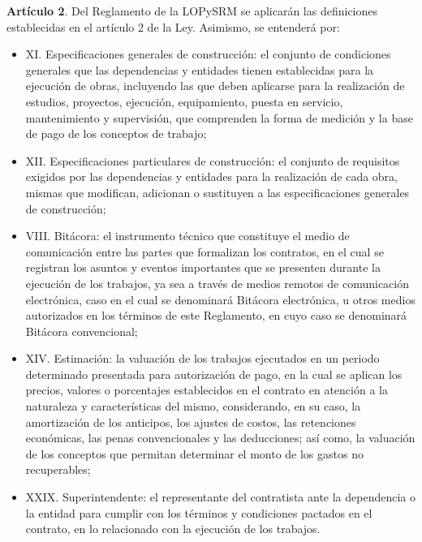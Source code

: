 \textbf{Artículo 2}. Del Reglamento de la LOPySRM se aplicarán las definiciones establecidas en el artículo 2 de la Ley. Asimismo, se entenderá por:
\begin{itemize}
    \item XI. Especificaciones generales de construcción: el conjunto de condiciones generales que las dependencias y entidades tienen establecidas para la ejecución de obras, incluyendo las que deben aplicarse para la realización de estudios, proyectos, ejecución, equipamiento, puesta en servicio, mantenimiento y supervisión, que comprenden la forma de medición y la base de pago de los conceptos de trabajo;
    \item XII. Especificaciones particulares de construcción: el conjunto de requisitos exigidos por las dependencias y entidades para la realización de cada obra, mismas que modifican, adicionan o sustituyen a las especificaciones generales de construcción;
    \item VIII. Bitácora: el instrumento técnico que constituye el medio de comunicación entre las partes que formalizan los contratos, en el cual se registran los asuntos y eventos importantes que se presenten durante la ejecución de los trabajos, ya sea a través de medios remotos de comunicación electrónica, caso en el cual se denominará Bitácora electrónica, u otros medios autorizados en los términos de este Reglamento, en cuyo caso se denominará Bitácora convencional;
    \item XIV. Estimación: la valuación de los trabajos ejecutados en un periodo determinado presentada para autorización de pago, en la cual se aplican los precios, valores o porcentajes establecidos en el contrato en atención a la naturaleza y características del mismo, considerando, en su caso, la amortización de los anticipos, los ajustes de costos, las retenciones económicas, las penas convencionales y las deducciones; así como, la valuación de los conceptos que permitan determinar el monto de los gastos no recuperables;
    \item XXIX. Superintendente: el representante del contratista ante la dependencia o la entidad para cumplir con los términos y condiciones pactados en el contrato, en lo relacionado con la ejecución de los trabajos.
\end{itemize}

